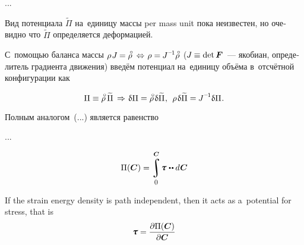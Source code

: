 ...

\begin{otherlanguage}{russian}

Вид потенциала ${\widetilde{\Pi}}$ на~единицу \hbox{массы} per mass unit пока неизвестен, но очевидно что ${\widetilde{\Pi}}$ определяется деформацией.

С~помощью баланса массы ${\rho \hspace{.2ex} J \hspace{-0.1ex} = \mathcircabove{\rho} \hspace{.5ex} \Leftrightarrow \hspace{.2ex} \rho = \hspace{-0.1ex} J^{\expminusone} \mathcircabove{\rho}}$ (${J \hspace{-0.1ex} \equiv \operatorname{det} \bm{F}\hspace{-0.12ex}}$~--- якобиан, определитель градиента движения) введём потенциал на~единицу объёма в~отсчётной конфигурации как

\nopagebreak\begin{equation}
\Pi \equiv \mathcircabove{\rho} \hspace{.4ex} \widetilde{\Pi}
\hspace{.4ex} \Rightarrow \hspace{.2ex}
\variation{\Pi} = \mathcircabove{\rho} \hspace{.25ex} \variation{\widetilde{\Pi}}
\hspace{.1ex}, \:\:
\rho \hspace{.2ex} \variation{\widetilde{\Pi}} = \hspace{-0.1ex} J^{\expminusone} \variation{\Pi} \hspace{.1ex}.
\end{equation}

Полным аналогом~(...) является равенство



...

{\small

\[ \Pi({\boldsymbol{\bm{C}}}) = \displaystyle \integral_{\raisemath{-0.25em}{\hspace{-0.1ex}\scalebox{0.85}{$0$}}}^{\raisemath{.15em}{\bm{C}}} \hspace{-0.25ex} \mathboldtau \hspace{.1ex} \dotdotp d \hspace{.1ex} \boldsymbol{\bm{C}} \]

If the strain energy density is path independent, then it acts as a~potential for stress, that is
\[ \displaystyle \mathboldtau = {\frac{\partial \Pi(\bm{C})}{\partial \bm{C}}} \]

}
\end{otherlanguage}
